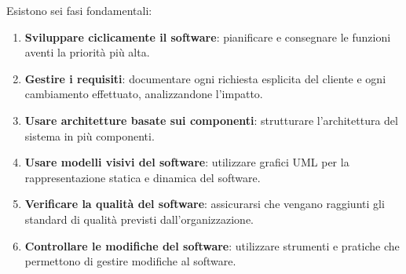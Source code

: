 \begin{solution}
\begin{itemize}
	\newline
	Esistono sei fasi fondamentali:
	\begin{enumerate}
		\item \textbf{Sviluppare ciclicamente il software}: pianificare e consegnare le funzioni aventi la priorità più alta.
		\item \textbf{Gestire i requisiti}: documentare ogni richiesta esplicita del cliente e ogni cambiamento effettuato, analizzandone l'impatto.
		\item \textbf{Usare architetture basate sui componenti}: strutturare l'architettura del sistema in più componenti.
		\item \textbf{Usare modelli visivi del software}: utilizzare grafici UML per la rappresentazione statica e dinamica del software.
		\item \textbf{Verificare la qualità del software}: assicurarsi che vengano raggiunti gli standard di qualità previsti dall'organizzazione.
		\item \textbf{Controllare le modifiche del software}: utilizzare strumenti e pratiche che permettono di gestire modifiche al software.
	\end{enumerate}
\end{itemize}

\end{solution}

